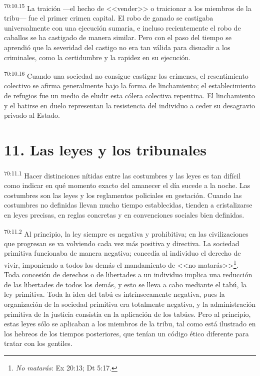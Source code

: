 \par
\textsuperscript{70:10.15} La traición ---el hecho de <<vender>> o traicionar a los miembros de la tribu--- fue el primer crimen capital. El robo de ganado se castigaba universalmente con una ejecución sumaria, e incluso recientemente el robo de caballos se ha castigado de manera similar. Pero con el paso del tiempo se aprendió que la severidad del castigo no era tan válida para disuadir a los criminales, como la certidumbre y la rapidez en su ejecución.

\par
\textsuperscript{70:10.16} Cuando una sociedad no consigue castigar los crímenes, el resentimiento colectivo se afirma generalmente bajo la forma de linchamiento; el establecimiento de refugios fue un medio de eludir esta cólera colectiva repentina. El linchamiento y el batirse en duelo representan la resistencia del individuo a ceder su desagravio privado al Estado.

\section*{11. Las leyes y los tribunales}
\par
\textsuperscript{70:11.1} Hacer distinciones nítidas entre las costumbres y las leyes es tan difícil como indicar en qué momento exacto del amanecer el día sucede a la noche. Las costumbres son las leyes y los reglamentos policiales en gestación. Cuando las costumbres no definidas llevan mucho tiempo establecidas, tienden a cristalizarse en leyes precisas, en reglas concretas y en convenciones sociales bien definidas.

\par
\textsuperscript{70:11.2} Al principio, la ley siempre es negativa y prohibitiva; en las civilizaciones que progresan se va volviendo cada vez más positiva y directiva. La sociedad primitiva funcionaba de manera negativa; concedía al individuo el derecho de vivir, imponiendo a todos los demás el mandamiento de <<no matarás>>\footnote{\textit{No matarás}: Ex 20:13; Dt 5:17.}. Toda concesión de derechos o de libertades a un individuo implica una reducción de las libertades de todos los demás, y esto se lleva a cabo mediante el tabú, la ley primitiva. Toda la idea del tabú es intrínsecamente negativa, pues la organización de la sociedad primitiva era totalmente negativa, y la administración primitiva de la justicia consistía en la aplicación de los tabúes. Pero al principio, estas leyes sólo se aplicaban a los miembros de la tribu, tal como está ilustrado en los hebreos de los tiempos posteriores, que tenían un código ético diferente para tratar con los gentiles.

